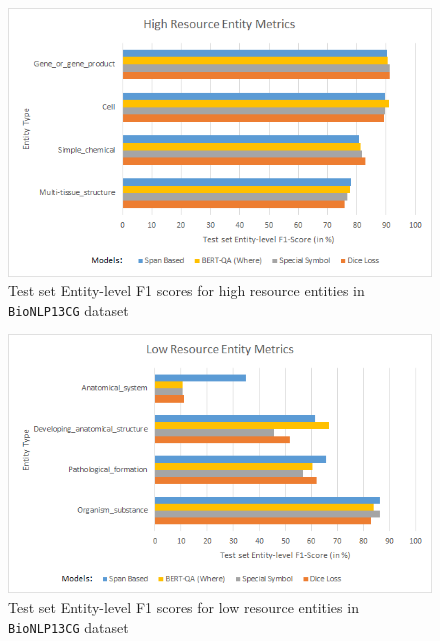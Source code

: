 \begin{figure}
    \centering
    \includegraphics[scale=1.25]{high_resource_entity_metrics}
    \caption{Test set Entity-level F1 scores for high resource entities in \texttt{BioNLP13CG} dataset}
    \label{fig:high_resource_entity_metrics}
\end{figure}

\begin{figure}
    \centering
    \includegraphics[scale=1.25]{low_resource_entity_metrics}
    \caption{Test set Entity-level F1 scores for low resource entities in \texttt{BioNLP13CG} dataset}
    \label{fig:low_resource_entity_metrics}
\end{figure}

